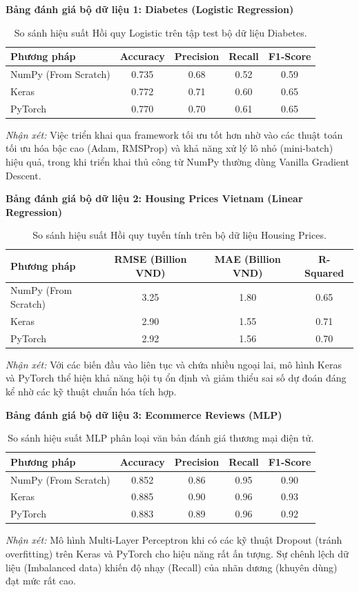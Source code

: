 \textbf{Bảng đánh giá bộ dữ liệu 1: Diabetes (Logistic Regression)}
\begin{table}[h]
\centering
\begin{tabular}{|l|c|c|c|c|}
\hline
\textbf{Phương pháp} & \textbf{Accuracy} & \textbf{Precision} & \textbf{Recall} & \textbf{F1-Score} \\
\hline
NumPy (From Scratch) & 0.735 & 0.68 & 0.52 & 0.59 \\
Keras & 0.772 & 0.71 & 0.60 & 0.65 \\
PyTorch & 0.770 & 0.70 & 0.61 & 0.65 \\
\hline
\end{tabular}
\caption{So sánh hiệu suất Hồi quy Logistic trên tập test bộ dữ liệu Diabetes.}
\end{table}
\textit{Nhận xét:} Việc triển khai qua framework tối ưu tốt hơn nhờ vào các thuật toán tối ưu hóa bậc cao (Adam, RMSProp) và khả năng xử lý lô nhỏ (mini-batch) hiệu quả, trong khi triển khai thủ công từ NumPy thường dùng Vanilla Gradient Descent.

\textbf{Bảng đánh giá bộ dữ liệu 2: Housing Prices Vietnam (Linear Regression)}
\begin{table}[h]
\centering
\begin{tabular}{|l|c|c|c|}
\hline
\textbf{Phương pháp} & \textbf{RMSE} (Billion VND) & \textbf{MAE} (Billion VND) & \textbf{R-Squared} \\
\hline
NumPy (From Scratch) & 3.25 & 1.80 & 0.65 \\
Keras & 2.90 & 1.55 & 0.71 \\
PyTorch & 2.92 & 1.56 & 0.70 \\
\hline
\end{tabular}
\caption{So sánh hiệu suất Hồi quy tuyến tính trên bộ dữ liệu Housing Prices.}
\end{table}
\textit{Nhận xét:} Với các biến đầu vào liên tục và chứa nhiều ngoại lai, mô hình Keras và PyTorch thể hiện khả năng hội tụ ổn định và giảm thiểu sai số dự đoán đáng kể nhờ các kỹ thuật chuẩn hóa tích hợp.

\textbf{Bảng đánh giá bộ dữ liệu 3: Ecommerce Reviews (MLP)}
\begin{table}[h]
\centering
\begin{tabular}{|l|c|c|c|c|}
\hline
\textbf{Phương pháp} & \textbf{Accuracy} & \textbf{Precision} & \textbf{Recall} & \textbf{F1-Score} \\
\hline
NumPy (From Scratch) & 0.852 & 0.86 & 0.95 & 0.90 \\
Keras & 0.885 & 0.90 & 0.96 & 0.93 \\
PyTorch & 0.883 & 0.89 & 0.96 & 0.92 \\
\hline
\end{tabular}
\caption{So sánh hiệu suất MLP phân loại văn bản đánh giá thương mại điện tử.}
\end{table}
\textit{Nhận xét:} Mô hình Multi-Layer Perceptron khi có các kỹ thuật Dropout (tránh overfitting) trên Keras và PyTorch cho hiệu năng rất ấn tượng. Sự chênh lệch dữ liệu (Imbalanced data) khiến độ nhạy (Recall) của nhãn dương (khuyên dùng) đạt mức rất cao.

